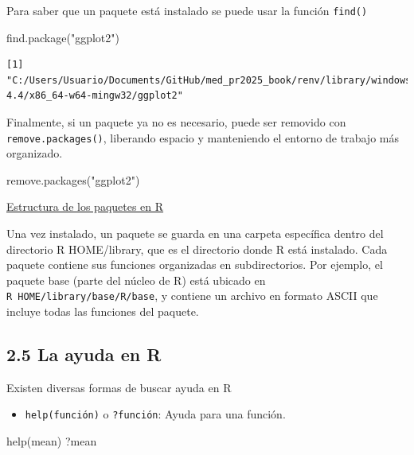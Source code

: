 \documentclass[
  letterpaper,
]{scrbook}
\newenvironment{Shaded}{\begin{snugshade}}{\end{snugshade}}
\newcommand{\FunctionTok}[1]{\textcolor[rgb]{0.28,0.35,0.67}{#1}}
\newcommand{\NormalTok}[1]{\textcolor[rgb]{0.00,0.23,0.31}{#1}}
\newcommand{\StringTok}[1]{\textcolor[rgb]{0.13,0.47,0.30}{#1}}
\providecommand{\tightlist}{%
  \setlength{\itemsep}{0pt}\setlength{\parskip}{0pt}}\usepackage{longtable,booktabs,array}
\begin{document}
Para saber que un paquete está instalado se puede usar la función
\texttt{find()}

\begin{Shaded}
\begin{Highlighting}[]
\FunctionTok{find.package}\NormalTok{(}\StringTok{"ggplot2"}\NormalTok{)}
\end{Highlighting}
\end{Shaded}

\begin{verbatim}
[1] "C:/Users/Usuario/Documents/GitHub/med_pr2025_book/renv/library/windows/R-4.4/x86_64-w64-mingw32/ggplot2"
\end{verbatim}

Finalmente, si un paquete ya no es necesario, puede ser removido con
\texttt{remove.packages()}, liberando espacio y manteniendo el entorno
de trabajo más organizado.

\begin{Shaded}
\begin{Highlighting}[]
\FunctionTok{remove.packages}\NormalTok{(}\StringTok{"ggplot2"}\NormalTok{)}
\end{Highlighting}
\end{Shaded}

\uline{Estructura de los paquetes en R}

Una vez instalado, un paquete se guarda en una carpeta específica dentro
del directorio R HOME/library, que es el directorio donde R está
instalado. Cada paquete contiene sus funciones organizadas en
subdirectorios. Por ejemplo, el paquete base (parte del núcleo de R)
está ubicado en \texttt{R\ HOME/library/base/R/base}, y contiene un
archivo en formato ASCII que incluye todas las funciones del paquete.

\hypertarget{la-ayuda-en-r}{%
\subsection{2.5 La ayuda en R}\label{la-ayuda-en-r}}

Existen diversas formas de buscar ayuda en R

\begin{itemize}
\tightlist
\item
  \texttt{help(función)} o \texttt{?función}: Ayuda para una función.
\end{itemize}

\begin{Shaded}
\begin{Highlighting}[]
\FunctionTok{help}\NormalTok{(mean)}
\NormalTok{?mean}
\end{Highlighting}
\end{Shaded}
\end{document}
